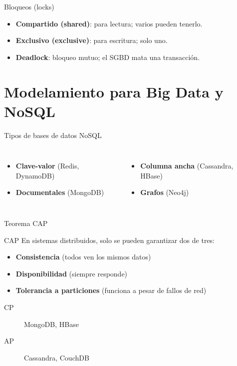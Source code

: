 \documentclass[aspectratio=169, 10pt, xcolor=table]{beamer}
\begin{document}
\begin{frame}{Bloqueos (locks)}
    \begin{itemize}
        \item \textbf{Compartido (shared)}: para lectura; varios pueden tenerlo.
        \item \textbf{Exclusivo (exclusive)}: para escritura; solo uno.
        \item \textbf{Deadlock}: bloqueo mutuo; el SGBD mata una transacción.
    \end{itemize}
\end{frame}

\section{Modelamiento para Big Data y NoSQL}

\begin{frame}{Tipos de bases de datos NoSQL}
    \begin{columns}[t]
        \begin{itemize}
            \item \textbf{Clave-valor} (Redis, DynamoDB)
            \item \textbf{Documentales} (MongoDB)
        \end{itemize}
        \begin{itemize}
            \item \textbf{Columna ancha} (Cassandra, HBase)
            \item \textbf{Grafos} (Neo4j)
        \end{itemize}
    \end{columns}
\end{frame}

\begin{frame}{Teorema CAP}
    \begin{block}{CAP}
        En sistemas distribuidos, solo se pueden garantizar dos de tres:
        \begin{itemize}
            \item \textbf{Consistencia} (todos ven los mismos datos)
            \item \textbf{Disponibilidad} (siempre responde)
            \item \textbf{Tolerancia a particiones} (funciona a pesar de fallos de red)
        \end{itemize}
    \end{block}
    \begin{description}
        \item[CP] MongoDB, HBase
        \item[AP] Cassandra, CouchDB
    \end{description}
\end{frame}
\end{document}
